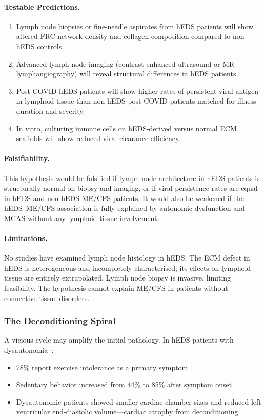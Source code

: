 \begin{speculation}
\paragraph{Testable Predictions.}
\begin{enumerate}
    \item Lymph node biopsies or fine-needle aspirates from hEDS patients will show altered FRC network density and collagen composition compared to non-hEDS controls.
    \item Advanced lymph node imaging (contrast-enhanced ultrasound or MR lymphangiography) will reveal structural differences in hEDS patients.
    \item Post-COVID hEDS patients will show higher rates of persistent viral antigen in lymphoid tissue than non-hEDS post-COVID patients matched for illness duration and severity.
    \item In vitro, culturing immune cells on hEDS-derived versus normal ECM scaffolds will show reduced viral clearance efficiency.
\end{enumerate}

\paragraph{Falsifiability.}
This hypothesis would be falsified if lymph node architecture in hEDS patients is structurally normal on biopsy and imaging, or if viral persistence rates are equal in hEDS and non-hEDS ME/CFS patients. It would also be weakened if the hEDS--ME/CFS association is fully explained by autonomic dysfunction and MCAS without any lymphoid tissue involvement.

\paragraph{Limitations.}
No studies have examined lymph node histology in hEDS. The ECM defect in hEDS is heterogeneous and incompletely characterised; its effects on lymphoid tissue are entirely extrapolated. Lymph node biopsy is invasive, limiting feasibility. The hypothesis cannot explain ME/CFS in patients without connective tissue disorders.
\end{speculation}

\subsubsection{The Deconditioning Spiral}

A vicious cycle may amplify the initial pathology. In hEDS patients with dysautonomia~\cite{RuizMaya2021cardiac}:
\begin{itemize}
    \item 78\% report exercise intolerance as a primary symptom
    \item Sedentary behavior increased from 44\% to 85\% after symptom onset
    \item Dysautonomic patients showed smaller cardiac chamber sizes and reduced left ventricular end-diastolic volume---cardiac atrophy from deconditioning
\end{itemize}

